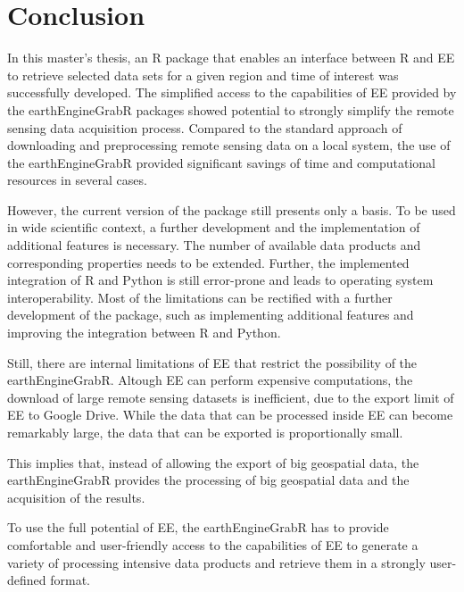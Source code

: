 
\chapter{Conclusion}


In this master's thesis, an R package that enables an interface between R and EE to retrieve selected data sets for a given region and time of interest was successfully developed. The simplified access to the capabilities of EE provided by the earthEngineGrabR packages showed potential to strongly simplify the remote sensing data acquisition process. Compared to the standard approach of downloading and preprocessing remote sensing data on a local system, the use of the earthEngineGrabR provided significant savings of time and computational resources in several cases. 

However, the current version of the package still presents only a basis. To be used in wide scientific context, a further development and the implementation of additional features is necessary. 
The number of available data products and corresponding properties needs to be extended.
Further, the implemented integration of R and Python is still error-prone and leads to operating system interoperability.  
Most of the limitations can be rectified with a further development of the package, such as implementing additional features and improving the integration between R and Python.

Still, there are internal limitations of EE that restrict the possibility of the earthEngineGrabR. Altough EE can perform expensive computations, the download of large remote sensing datasets is inefficient, due to the export limit of EE to Google Drive. 
While the data that can be processed inside EE can become remarkably large, the data that can be exported is proportionally small.

This implies that, instead of allowing the export of big geospatial data, the earthEngineGrabR provides the processing of big geospatial data and the acquisition of the results.

To use the full potential of EE, the earthEngineGrabR has to provide comfortable and user-friendly access to the capabilities of EE to generate a variety of processing intensive data products and retrieve them in a strongly user-defined format.



